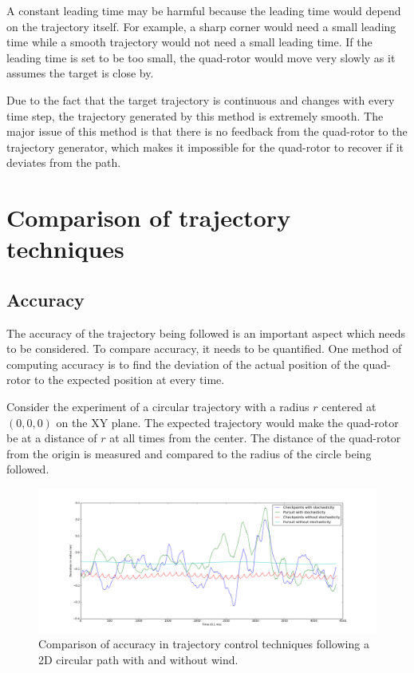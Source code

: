 \documentclass[hidelinks,BTech]{iitmdiss}
\begin{document}
A constant leading time may be harmful because the leading time would depend on the trajectory itself. For example, a sharp corner would need a small leading time while a smooth trajectory would not need a small leading time. If the leading time is set to be too small, the quad-rotor would move very slowly as it assumes the target is close by.

Due to the fact that the target trajectory is continuous and changes with every time step, the trajectory generated by this method is extremely smooth. The major issue of this method is that there is no feedback from the quad-rotor to the trajectory generator, which makes it impossible for the quad-rotor to recover if it deviates from the path.

\section{Comparison of trajectory techniques}

\subsection{Accuracy}
The accuracy of the trajectory being followed is an important aspect which needs to be considered. To compare accuracy, it needs to be quantified. One method of computing accuracy is to find the deviation of the actual position of the quad-rotor to the expected position at every time.

Consider the experiment of a circular trajectory with a radius $r$ centered at $(0,0,0)$ on the XY plane. The expected trajectory would make the quad-rotor be at a distance of $r$ at all times from the center. The distance of the quad-rotor from the origin is measured and compared to the radius of the circle being followed.

\begin{figure}[H]
  \centering
    \includegraphics[width=\textwidth]{comparison_accuracy.png}
    \caption{Comparison of accuracy in trajectory control techniques following a 2D circular path with and without wind.}
    \label{fig:TrajectoryComparison}
\end{figure}
\end{document}
